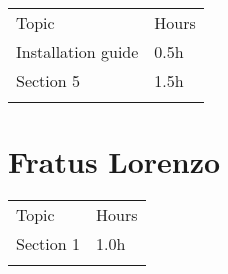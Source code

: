 \begin{longtable}[]{@{}
  >{\raggedright\arraybackslash}p{}
  >{\raggedleft\arraybackslash}p{}@{}}
\toprule
Topic & Hours \\ \addlinespace
\midrule
\endhead
Installation guide & 0.5h \\ \addlinespace
Section 5 & 1.5h \\ \addlinespace
\bottomrule
\end{longtable}

\section{Fratus Lorenzo}

\begin{longtable}[]{@{}
  >{\raggedright\arraybackslash}p{}
  >{\raggedleft\arraybackslash}p{}@{}}
\toprule
Topic & Hours \\ \addlinespace
\midrule
\endhead
Section 1 & 1.0h \\ \addlinespace
\bottomrule
\end{longtable}

